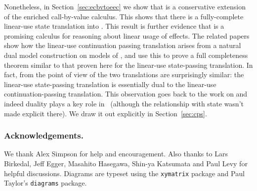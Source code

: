 \documentclass{LMCS}
\newcommand{\pj}[3]{#1 \mathrel{\vdash^p} #2 \colon \! #3}
\newcommand{\codefont}[1]{\mathtt{#1}}
\begin{document}
Nonetheless, in Section~\ref{sec:ecbvtoeec} we show that  is a
conservative extension of the enriched call-by-value calculus. This
shows that there is a fully-complete linear-use state translation into
.  This result is further evidence that  is a promising
calculus for reasoning about linear usage of effects. The related
papers~\cite{Mogelberg:fossacs:10,EEC:LCPS:journal} show how the linear-use
continuation passing translation arises from a natural dual model
construction on models of , and use this to prove a full completeness theorem 
similar to that proven here for the linear-use state-passing translation.
In fact, from the point of view of
 the two translations are surprisingly similar: the linear-use
state-passing translation is essentially dual to the linear-use
continuation-passing translation. This observation goes back to the work on
 and indeed duality plays a key role in~\cite{Mogelberg:fossacs:10} (although the relationship with state wasn't made explicit there). We draw it out explicitly in
Section~\ref{sec:cps}.


\subsubsection*{Acknowledgements.}
We thank Alex Simpson for help and encouragement. Also thanks to Lars Birkedal, Jeff Egger, Masahito Hasegawa, Shin-ya Katsumata and Paul Levy for helpful discussions. Diagrams are typeset using the \texttt{xymatrix} package
and Paul Taylor's \texttt{diagrams} package.



\newcommand{\ccat}{\mathfrak{K}}
\newcommand{\dcat}{\mathbb{D}}

\newcommand{\cbvinp}[2]{\codefont{in}_{#1}^p(#2)}
\newcommand{\cbvimagep}[1]{\codefont{image}^p(#1)}
\newcommand{\cbvcasep}[5]{\codefont{case}^p~#1~\codefont{of}~(\cbvinl{#2}.#3|\cbvinr{#4}.#5)}

\newcommand{\geff}{e} 
\newcommand{\geffj}[3]{\pj{#1}{#2}{#3}}
\newcommand{\geffin}[2]{\codefont{in}_{#1}(#2)} \newcommand{\geffinname}[1]{\codefont{in}_{#1}} \newcommand{\geffabs}[2]{#1 \text{ to } \{#2 \}}

\newcommand{\cbvin}[2]{{\codefont{in}}_{#1}(#2)}
\newcommand{\cbvinl}[1]{\cbvin{1}{#1}}
\newcommand{\cbvinr}[1]{\cbvin{2}{#1}}
\newcommand{\cbvcase}[5]{\codefont{case}~#1~\codefont{of}~(\cbvinl{#2}.#3|\cbvinr{#4}.#5)}
\newcommand{\cbvcasen}[6]{\codefont{case}~#1~\codefont{of}~(\codefont{in_1}({#2}).#3|\dots|\codefont{in_{#4}}({#5}).#6)}
\newcommand{\cbvcasenp}[6]{\codefont{case}^p~#1~\codefont{of}~(\codefont{in_1}({#2}).#3|\dots|\codefont{in_{#4}}({#5}).#6)}
\end{document}
